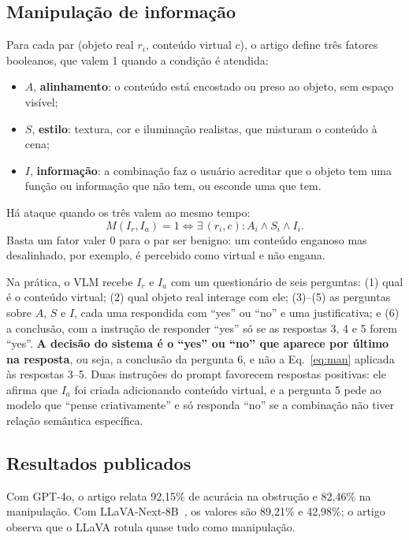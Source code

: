 \documentclass[journal,onecolumn]{IEEEtran}
\newcommand{\Ir}{I_r}
\newcommand{\Ia}{I_a}
\begin{document}
\subsection{Manipulação de informação}
Para cada par (objeto real $r_i$, conteúdo virtual $c$), o artigo define três fatores booleanos, que
valem 1 quando a condição é atendida:
\begin{itemize}
\item $A$, \textbf{alinhamento}: o conteúdo está encostado ou preso ao objeto, sem espaço visível;
\item $S$, \textbf{estilo}: textura, cor e iluminação realistas, que misturam o conteúdo à cena;
\item $I$, \textbf{informação}: a combinação faz o usuário acreditar que o objeto tem uma função ou
  informação que não tem, ou esconde uma que tem.
\end{itemize}
Há ataque quando os três valem ao mesmo tempo:
\begin{equation}
M(\Ir,\Ia)=1 \iff \exists\, (r_i,c): A_i \wedge S_i \wedge I_i .
\label{eq:man}
\end{equation}
Basta um fator valer 0 para o par ser benigno: um conteúdo enganoso mas desalinhado, por exemplo, é
percebido como virtual e não engana.

Na prática, o VLM recebe $\Ir$ e $\Ia$ com um questionário de seis perguntas: (1) qual é o conteúdo
virtual; (2) qual objeto real interage com ele; (3)--(5) as perguntas sobre $A$, $S$ e $I$, cada uma
respondida com ``yes'' ou ``no'' e uma justificativa; e (6) a conclusão, com a instrução de responder
``yes'' só se as respostas 3, 4 e 5 forem ``yes''. \textbf{A decisão do sistema é o ``yes'' ou ``no''
que aparece por último na resposta}, ou seja, a conclusão da pergunta 6, e não a Eq.~\eqref{eq:man}
aplicada às respostas 3--5. Duas instruções do prompt favorecem respostas positivas: ele afirma que
$\Ia$ foi criada adicionando conteúdo virtual, e a pergunta 5 pede ao modelo que ``pense
criativamente'' e só responda ``no'' se a combinação não tiver relação semântica específica.

\subsection{Resultados publicados}
Com GPT-4o, o artigo relata 92,15\% de acurácia na obstrução e 82,46\% na manipulação. Com
LLaVA-Next-8B~\cite{llava}, os valores são 89,21\% e 42,98\%; o artigo observa que o LLaVA rotula quase
tudo como manipulação.
\end{document}
